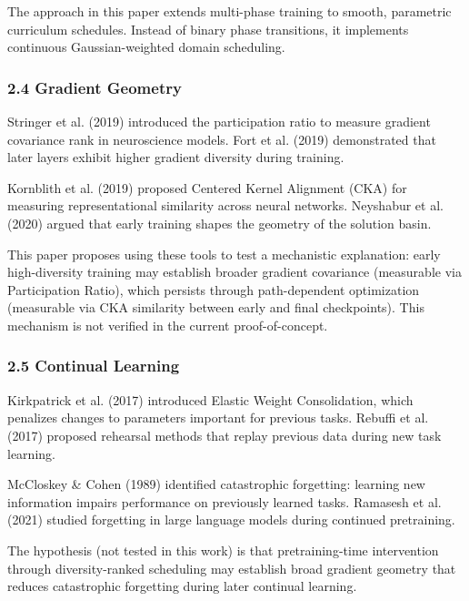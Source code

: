 The approach in this paper extends multi-phase training to smooth, parametric curriculum schedules. Instead of binary phase transitions, it implements continuous Gaussian-weighted domain scheduling.

\subsubsection{2.4 Gradient Geometry}

Stringer et al. (2019) introduced the participation ratio to measure gradient covariance rank in neuroscience models. Fort et al. (2019) demonstrated that later layers exhibit higher gradient diversity during training.

Kornblith et al. (2019) proposed Centered Kernel Alignment (CKA) for measuring representational similarity across neural networks. Neyshabur et al. (2020) argued that early training shapes the geometry of the solution basin.

This paper proposes using these tools to test a mechanistic explanation: early high-diversity training may establish broader gradient covariance (measurable via Participation Ratio), which persists through path-dependent optimization (measurable via CKA similarity between early and final checkpoints). This mechanism is not verified in the current proof-of-concept.

\subsubsection{2.5 Continual Learning}

Kirkpatrick et al. (2017) introduced Elastic Weight Consolidation, which penalizes changes to parameters important for previous tasks. Rebuffi et al. (2017) proposed rehearsal methods that replay previous data during new task learning.

McCloskey \& Cohen (1989) identified catastrophic forgetting: learning new information impairs performance on previously learned tasks. Ramasesh et al. (2021) studied forgetting in large language models during continued pretraining.

The hypothesis (not tested in this work) is that pretraining-time intervention through diversity-ranked scheduling may establish broad gradient geometry that reduces catastrophic forgetting during later continual learning.
